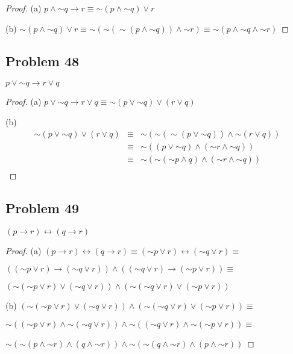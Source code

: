 \documentclass[14pt]{extarticle}
\newcommand{\bic}{\leftrightarrow}
\begin{document}
\begin{proof}
(a) $p \wedge {\sim q} \to r \equiv {\sim(p \wedge {\sim q})} \vee r$

(b) ${\sim(p \wedge {\sim q})} \vee r \equiv {\sim ({\sim ({\sim(p \wedge {\sim q})})} \wedge {\sim r})} \equiv {\sim (p \wedge {\sim q} \wedge {\sim r})}$
\end{proof}

\subsection{Problem 48}
$p \vee {\sim q} \to r \vee q$

\begin{proof}
(a) $p \vee {\sim q} \to r \vee q \equiv {\sim (p \vee {\sim q})} \vee (r \vee q)$

(b) 
$$
\begin{array}{rcl}
{\sim (p \vee {\sim q})} \vee (r \vee q) & \equiv & {\sim ({\sim ({\sim (p \vee {\sim q})})} \wedge {\sim (r \vee q)})} \\
& \equiv &  {\sim((p \vee {\sim q}) \wedge ({\sim r} \wedge {\sim q}))} \\
& \equiv & {\sim({\sim ({\sim p} \wedge q)} \wedge ({\sim r} \wedge {\sim q}))} \\
\end{array}
$$
\end{proof}

\subsection{Problem 49}
$(p \to r) \bic (q \to r)$

\begin{proof}
(a) $(p \to r) \bic (q \to r) \equiv ({\sim p} \vee r) \bic ({\sim q} \vee r) \equiv$

$(({\sim p} \vee r) \to ({\sim q} \vee r)) \wedge (({\sim q} \vee r) \to ({\sim p} \vee r)) \equiv$

$({\sim ({\sim p} \vee r)} \vee ({\sim q} \vee r)) \wedge ({\sim ({\sim q} \vee r)} \vee ({\sim p} \vee r))$

(b) $({\sim ({\sim p} \vee r)} \vee ({\sim q} \vee r)) \wedge ({\sim ({\sim q} \vee r)} \vee ({\sim p} \vee r)) \equiv$

${\sim (({\sim p} \vee r) \wedge {\sim ({\sim q} \vee r)})} \wedge {\sim (({\sim q} \vee r) \wedge {\sim ({\sim p} \vee r)})} \equiv$

${\sim ({\sim (p \wedge {\sim r})} \wedge (q \wedge {\sim r}))} \wedge {\sim ({\sim (q \wedge {\sim r})} \wedge (p \wedge {\sim r}))}$
\end{proof}
\end{document}
